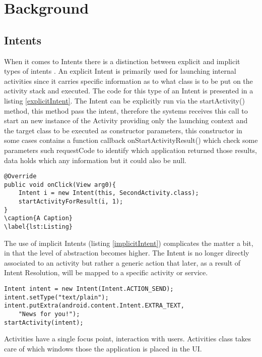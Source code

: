 \section{Background}
\label{background}

\subsection{Intents} 
\label{intents}
When it comes to Intents there is a distinction between explicit and implicit types of intents \cite{intent}.
An explicit Intent is primarily used for launching internal activities since it carries specific information as to what class is to be put on the activity stack and executed. The code for this type of an Intent is presented in a listing \ref{explicitIntent}. The Intent can be explicitly run via the startActivity() method, this method pass the intent, therefore the systems receives this call to start an new instance of the Activity providing only the launching context and the target class to be executed as constructor parameters, this constructor in some cases contains a function callback onStartActivityResult() which check some parameters such requestCode to identify which application returned those results, data holds which any information but it could also be null.

\footnotesize\begin{lstlisting}[label=explicitIntent,caption=Explicit Intent]
@Override
public void onClick(View arg0){
    Intent i = new Intent(this, SecondActivity.class);
    startActivityForResult(i, 1);
}
\caption{A Caption}
\label{lst:Listing}
\end{lstlisting}

The use of implicit Intents (listing \ref{implicitIntent}) complicates the matter a bit, in that the level of abstraction becomes higher. The Intent is no longer directly associated to an activity but rather a generic action that later, as a result of Intent Resolution, will be mapped to a specific activity or service.

{\footnotesize\begin{lstlisting}[label=implicitIntent,caption=Implicit Intent]
Intent intent = new Intent(Intent.ACTION_SEND);
intent.setType("text/plain");
intent.putExtra(android.content.Intent.EXTRA_TEXT, 
	"News for you!");
startActivity(intent);
\end{lstlisting}}

Activities have a single focus point, interaction with users. Activities class takes care of which windows those the application is placed in the UI. 


